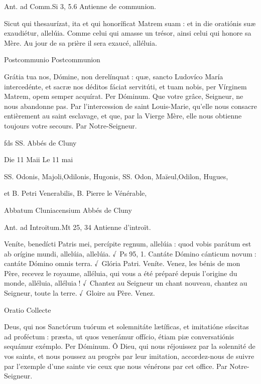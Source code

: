 \begin{paracol}{2}
Ant. ad Comm.\hfill Si 3, 5.6
\switchcolumn
Antienne de communion.
\switchcolumn*

Sicut qui thesaurízat, ita et qui honoríficat Matrem suam : et in die oratiónis suæ exaudiétur, allelúia.
\switchcolumn
Comme celui qui amasse un trésor, ainsi celui qui honore sa Mère. Au jour de sa prière il sera exaucé, alléluia.
\switchcolumn*

Postcommunio
\switchcolumn
Postcommunion
\switchcolumn*

Grátia tua nos, Dómine, non  derelínquat : quæ, sancto Ludovíco María intercedénte, et sacræ nos déditos fáciat servitúti, et tuam nobis, per Vírginem Matrem, opem semper acquírat. Per Dóminum.
\switchcolumn
Que votre grâce, Seigneur, ne nous  abandonne pas. Par l’intercession de saint Louis-Marie, qu’elle nous consacre entièrement au saint esclavage, et que, par la Vierge Mère, elle nous obtienne toujours votre secours. Par Notre-Seigneur.
\switchcolumn*

fds
\switchcolumn
SS. Abbés de Cluny
\switchcolumn*

Die 11 Maii
\switchcolumn
Le 11 mai
\switchcolumn*

SS. Odonis, Majoli,Odilonis, Hugonis,
\switchcolumn
SS. Odon, Maïeul,Odilon, Hugues,
\switchcolumn*

et B. Petri Venerabilis,
\switchcolumn
B. Pierre le Vénérable,
\switchcolumn*

Abbatum Cluniacensium
\switchcolumn
Abbés de Cluny
\switchcolumn*


\switchcolumn

\switchcolumn*

Ant. ad Introitum.\hfill Mt 25, 34
\switchcolumn
Antienne d’introït.
\switchcolumn*

Veníte, benedícti Patris mei, percípite regnum, allelúia : quod vobis parátum est ab orígine mundi, allelúia, allelúia. √~Ps 95, 1. Cantáte Dómino cánticum novum : cantáte Dómino omnis terra. √~Glória Patri. Veníte.
\switchcolumn
Venez, les bénis de mon Père, recevez le royaume, alléluia, qui vous a été préparé depuis l’origine du monde, alléluia, alléluia ! √~Chantez au Seigneur un chant nouveau, chantez au Seigneur, toute la terre. √~Gloire au Père. Venez.
\switchcolumn*

Oratio
\switchcolumn
Collecte
\switchcolumn*

Deus, qui nos Sanctórum tuórum et  solemnitáte lætíficas, et imitatióne súscitas ad proféctum : præsta, ut quos venerámur offício, étiam piæ conversatiónis sequámur exémplo. Per Dóminum.
\switchcolumn
Ô Dieu, qui nous réjouissez par la solennité de vos saints, et nous poussez au progrès par leur imitation, accordez-nous de suivre par l’exemple d’une sainte vie ceux que nous vénérons par cet office. Par Notre-Seigneur.
\switchcolumn*


\end{paracol}
